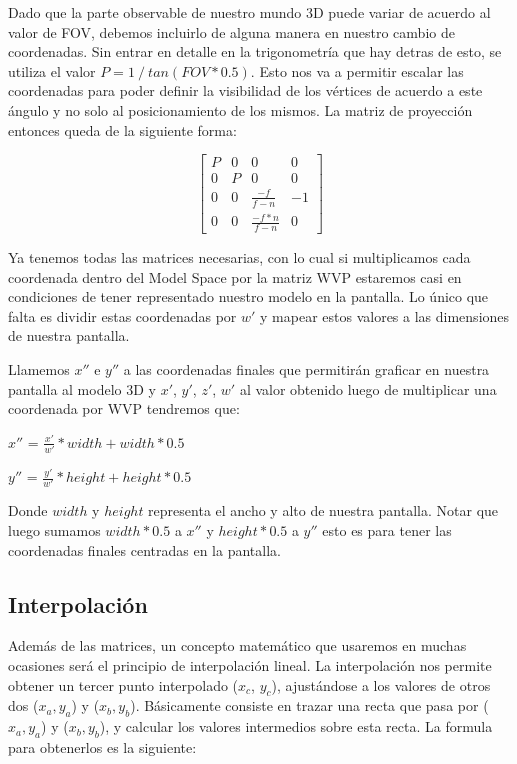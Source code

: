 \documentclass[a4paper]{article}
\begin{document}
Dado que la parte observable de nuestro mundo 3D puede variar de acuerdo al valor de FOV, debemos incluirlo de alguna manera en nuestro cambio de coordenadas. Sin entrar en detalle en la trigonometría que hay detras de esto, se utiliza el valor $P = 1 \ / \ tan(FOV * 0.5)$. Esto nos va a permitir escalar las coordenadas para poder definir la visibilidad de los vértices de acuerdo a este ángulo y no solo al posicionamiento de los mismos.
La matriz de proyección entonces queda de la siguiente forma:


\[
\begin{bmatrix}
P & 0 & 0 & 0 \\
0 & P & 0 & 0 \\
0 & 0 & \frac{-f}{f-n} & -1 \\
0 & 0 & \frac{-f*n}{f-n} & 0  
\end{bmatrix}
\]


Ya tenemos todas las matrices necesarias, con lo cual si multiplicamos cada coordenada dentro del Model Space por la matriz WVP estaremos casi en condiciones de tener representado nuestro modelo en la pantalla. Lo único que falta es dividir estas coordenadas por $w'$ y mapear estos valores a las dimensiones de nuestra pantalla.\newline


Llamemos $x''$ e $y''$ a las coordenadas finales que permitirán graficar en nuestra pantalla al modelo 3D y $x'$, $y'$, $z'$, $w'$ al valor obtenido luego de multiplicar una coordenada por WVP tendremos que: \newline

$x''$ = $\frac{x'}{w'}*width +  width*0.5$ \newline

$y''$ = $\frac{y'}{w'}*height +  height*0.5$ \newline

Donde $width$ y $height$ representa el ancho y alto de nuestra pantalla. Notar que luego sumamos $width*0.5$ a $x''$ y $height*0.5$ a $y''$ esto es para tener las coordenadas finales centradas en la pantalla.

\subsection{Interpolación}
Además de las matrices, un concepto matemático que usaremos en muchas ocasiones será el principio de interpolación lineal. La interpolación nos permite obtener un tercer punto interpolado ($x_c$, $y_c$),  ajustándose a los valores de otros dos ($x_a, y_a$) y ($x_b, y_b$). Básicamente consiste en trazar una recta que pasa por ($x_a,y_a$) y ($x_b,y_b$), y calcular los valores intermedios sobre esta recta. La formula para obtenerlos es la siguiente:
\end{document}
